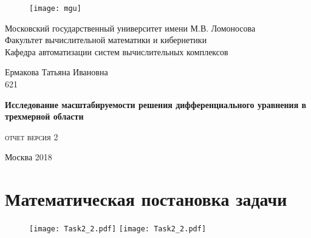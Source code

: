 \documentclass[12pt]{article}
\begin{document}
\sloppy

	\begin{titlepage}
		\newpage
		
		\begin{figure}[t]
			\centering
			\texttt{[image: mgu]}
		\end{figure}
		
		\begin{center}
			Московский государственный университет имени М.В. Ломоносова \\
			Факультет вычислительной математики и кибернетики \\
			Кафедра автоматизации систем вычислительных комплексов \\
		\end{center}
		
		\vspace{6em}
		
		\begin{center}
			\large
			Ермакова Татьяна Ивановна \\
			621
		\end{center}
		
		\begin{center}
			\Large
			\bfseries
			Исследование масштабируемости решения дифференциального уравнения в трехмерной области
		\end{center}
		
		\vspace{0.3em}
		
		\begin{center}
			\large
			\textsc{
				отчет версия 2
			}
		\end{center}
		
		\vspace{\fill}
		
		\begin{center}
			Москва 2018
		\end{center}
		
	\end{titlepage}


	\section{Математическая постановка задачи}
	\begin{figure}[htbp]
		\centering
		\texttt{[image: Task2\_2.pdf]}
		\texttt{[image: Task2\_2.pdf]}
	\end{figure}
\end{document}
